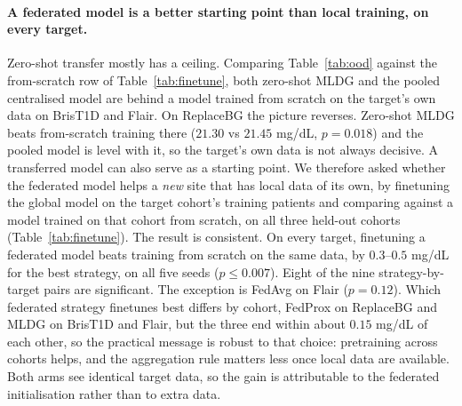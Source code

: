 \documentclass[10pt,letterpaper]{article}
\begin{document}
\paragraph{A federated model is a better starting point than local training, on
every target.} Zero-shot transfer mostly has a ceiling. Comparing
Table~\ref{tab:ood} against the from-scratch row of Table~\ref{tab:finetune},
both zero-shot MLDG and the pooled centralised model are behind a model
trained from scratch on the target's own data on BrisT1D and Flair. On
ReplaceBG the picture reverses. Zero-shot MLDG beats from-scratch training
there ($21.30$ vs $21.45$ mg/dL, $p = 0.018$) and the pooled model is level
with it, so the target's own data is not always decisive. A transferred model
can also serve as a starting point. We therefore asked whether the federated
model helps a \emph{new} site that has local data of its own, by finetuning
the global model on the target cohort's training patients and comparing
against a model trained on that cohort from scratch, on all three held-out
cohorts (Table~\ref{tab:finetune}). The result is consistent. On every
target, finetuning a federated model beats training from scratch on the same
data, by $0.3$--$0.5$ mg/dL for the best strategy, on all five seeds
($p \le 0.007$). Eight of the nine strategy-by-target pairs are significant.
The exception is FedAvg on Flair ($p = 0.12$). Which federated strategy
finetunes best differs by cohort, FedProx on ReplaceBG and MLDG on BrisT1D
and Flair, but the three end within about $0.15$ mg/dL of each other, so the
practical message is robust to that choice: pretraining across cohorts helps,
and the aggregation rule matters less once local data are available. Both
arms see identical target data, so the gain is attributable to the federated
initialisation rather than to extra data.
\end{document}
